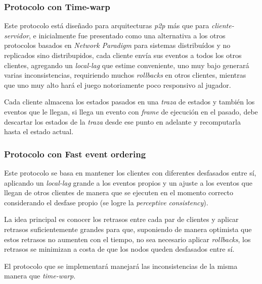 \subsubsection{Protocolo con Time-warp}


Este protocolo está diseñado para arquitecturas \emph{p2p} más que para \emph{cliente-servidor}, e inicialmente fue presentado como una alternativa a los otros protocolos basados en \emph{Network Paradigm} para sistemas distribuídos y no replicados sino distribupidos, cada cliente envía sus eventos a todos los otros clientes, agregando un \emph{local-lag} que estime conveniente, uno muy bajo generará varias inconsistencias, requiriendo muchos \emph{rollbacks} en otros clientes, mientras que uno muy alto hará el juego notoriamente poco responsivo al jugador.

Cada cliente almacena los estados pasados en una \emph{traza} de estados y también los eventos que le llegan, si llega un evento con \emph{frame} de ejecución en el pasado, debe descartar los estados de la \emph{traza} desde ese punto en adelante y recomputarla hasta el estado actual.

\subsubsection{Protocolo con Fast event ordering}

Este protocolo se basa en mantener los clientes con diferentes desfasados entre sí, aplicando un \emph{local-lag} grande a los eventos propios y un ajuste a los eventos que llegan de otros clientes de manera que se ejecuten en el momento correcto considerando el desfase propio (se logre la \emph{perceptive consistency}).

La idea principal es conocer los retrasos entre cada par de clientes y aplicar retrasos suficientemente grandes para que, suponiendo de manera optimista que estos retrasos no aumenten con el tiempo, no sea necesario aplicar \emph{rollbacks}, los retrasos se minimizan a costa de que los nodos queden desfasados entre sí.

El protocolo que se implementará manejará las inconsistencias de la misma manera que \emph{time-warp}.


